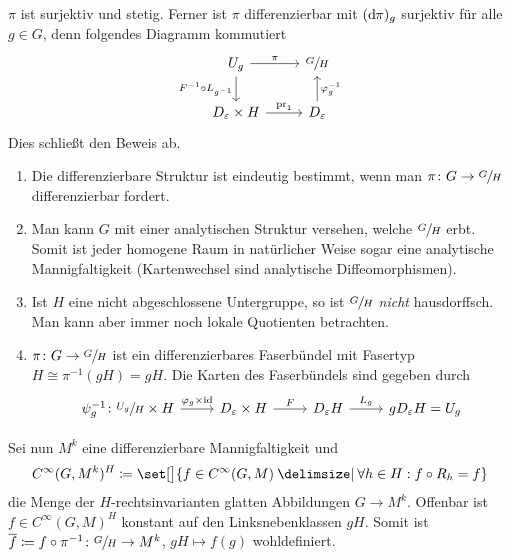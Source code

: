 \begin{beweis}
\begin{enumerate}[(i)]
		$\pi$ ist surjektiv und stetig. Ferner ist $\pi$ differenzierbar mit $(\mathrm{d}\mkern-1.0mu \pi)_g$ surjektiv für alle $g \in G$, denn folgendes Diagramm kommutiert
		\[
			\begin{tikzcd}
				U_g \dar["F^{-1} \circ L_{g^{-1}}"'] \rar["\pi"] & \sfrac{G}{H} \\
				D_\varepsilon \times H \rar["\pr_1"] & D_\varepsilon \uar["\varphi_g^{-1}"']
			\end{tikzcd}
		\]
		Dies schließt den Beweis ab.\qedhere
	\end{enumerate}
\end{beweis}

\begin{bemerkung*}[{name=[differenzierbare Struktur des Quotienten]}]
	\begin{enumerate}[1),itemsep=1pt]
		\item Die differenzierbare Struktur ist eindeutig bestimmt, wenn man $\pi \colon G \to \sfrac{G}{H}$ differenzierbar fordert.
		\item Man kann $G$ mit einer analytischen Struktur versehen, welche $\sfrac{G}{H}$ erbt.
		Somit ist jeder homogene Raum in natürlicher Weise sogar eine analytische Mannigfaltigkeit (Kartenwechsel sind analytische Diffeomorphismen).
		\item Ist $H$ eine nicht abgeschlossene Untergruppe, so ist $\sfrac{G}{H}$ \emph{nicht} hausdorffsch.
		Man kann aber immer noch lokale Quotienten betrachten.
		\item $\pi \colon G \to \sfrac{G}{H}$ ist ein differenzierbares Faserbündel mit Fasertyp $H \cong \pi^{-1}(gH) = gH$.
		Die Karten des Faserbündels sind gegeben durch
		\[
			\begin{tikzcd}
				\psi_g^{-1} \colon \sfrac{U_g}{H} \times H \rar["\varphi_g \times {\id}"] & D_\varepsilon \times H \rar["F"] & D_\varepsilon H \rar["L_g"] & g D_\varepsilon H = U_g
			\end{tikzcd}
		\]
	\end{enumerate}
\end{bemerkung*}

Sei nun $M^k$ eine differenzierbare Mannigfaltigkeit und 
\[
	C^\infty(G,M^k)^H \coloneqq \set[\big]{f \in C^\infty(G,M) \given \forall h \in H : f \circ R_h = f}
\]
die Menge der $H$-rechtsinvarianten glatten Abbildungen $G \to M^k$.
Offenbar ist $f \in C^\infty(G,M)^H$ konstant auf den Linksnebenklassen $g H$.
Somit ist $\overline{f} \coloneqq f \circ \pi^{-1} \colon \sfrac{G}{H} \to M^k$, $gH \mapsto f(g)$ wohldefiniert.

